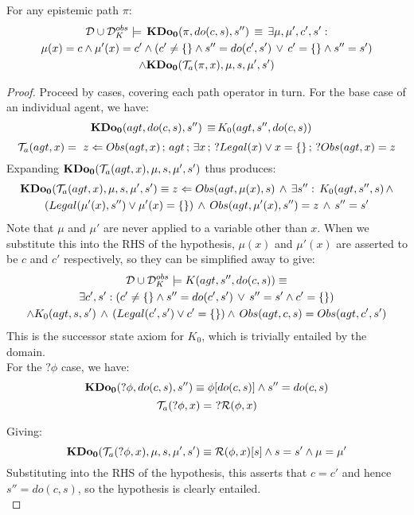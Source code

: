 \begin{lemma}
\label{lem:TrnA_works}For any epistemic path $\pi$:\begin{multline*}
\mathcal{D}\cup\mathcal{D}_{K}^{obs}\models\,\mathbf{KDo_{0}}(\pi,do(c,s),s'')\,\equiv\,\exists\mu,\mu',c',s':\\
\mu(x)=c\wedge\mu'(x)=c'\wedge\left(c'\neq\{\}\wedge s''=do(c',s')\,\vee\, c'=\{\}\wedge s''=s'\right)\\
\wedge\mathbf{KDo_{0}}(\mathcal{T}_{a}(\pi,x),\mu,s,\mu',s')\end{multline*}

\end{lemma}
\begin{proof}
Proceed by cases, covering each path operator in turn. For the base
case of an individual agent, we have:\begin{align*}
\mathbf{KDo_{0}}(agt,do(c,s),s'')\,\equiv\, & K_{0}(agt,s'',do(c,s))\end{align*}
 \[
\mathcal{T}_{a}(agt,x)=\,\, z\Leftarrow Obs(agt,x)\,;\, agt\,;\,\exists x\,;\,?Legal(x)\vee x=\{\}\,;\,?Obs(agt,x)=z\]
 Expanding $\mathbf{KDo_{0}}(\mathcal{T}_{a}(agt,x),\mu,s,\mu',s')$ thus produces:\begin{multline*}
\mathbf{KDo_{0}}(\mathcal{T}_{a}(agt,x),\mu,s,\mu',s')\equiv z\Leftarrow Obs(agt,\mu(x),s)\,\wedge\,\exists s'':\, K_{0}(agt,s'',s)\,\wedge\\
\left(Legal(\mu'(x),s'')\vee\mu'(x)=\{\}\right)\,\wedge\, Obs(agt,\mu'(x),s'')=z\,\wedge\, s''=s'\end{multline*}
 Note that $\mu$ and $\mu'$ are never applied to a variable other
than $x$. When we substitute this into the RHS of the hypothesis,
$\mu(x)$ and $\mu'(x)$ are asserted to be $c$ and $c'$ respectively,
so they can be simplified away to give:\begin{multline*}
\mathcal{D}\cup\mathcal{D}_{K}^{obs}\models K(agt,s'',do(c,s))\equiv\\
\exists c',s':\left(c'\neq\{\}\wedge s''=do(c',s')\,\vee\, s''=s'\wedge c'=\{\}\right)\\
\wedge K_{0}(agt,s,s')\,\wedge\,\left(Legal(c',s')\vee c'=\{\}\right)\wedge\, Obs(agt,c,s)=Obs(agt,c',s')\end{multline*}
 This is the successor state axiom for $K_{0}$, which is trivially
entailed by the domain.\\


For the $?\phi$ case, we have:\[
\mathbf{KDo_{0}}(?\phi,do(c,s),s'')\equiv\phi[do(c,s)]\wedge s''=do(c,s)\]
 \[
\mathcal{T}_{a}(?\phi,x)=\,\,?\mathcal{R}(\phi,x)\]


Giving:\[
\mathbf{KDo_{0}}(\mathcal{T}_{a}(?\phi,x),\mu,s,\mu',s')\equiv\mathcal{R}(\phi,x)[s]\wedge s=s'\wedge\mu=\mu'\]
 Substituting into the RHS of the hypothesis, this asserts that $c=c'$
and hence $s''=do(c,s)$, so the hypothesis is clearly entailed.\\



\end{proof}

